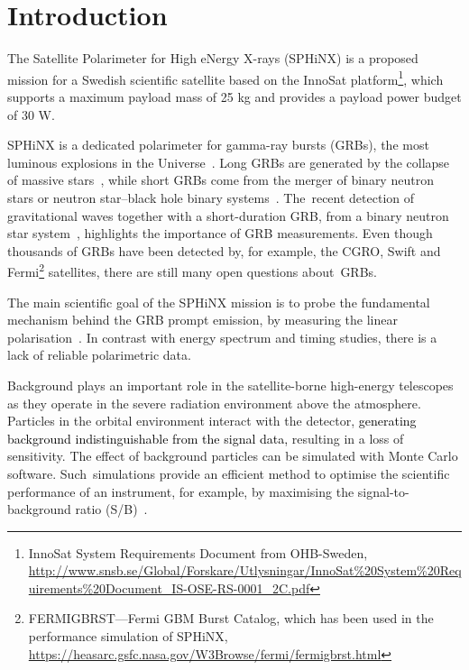 \documentclass[galaxies,article,accept,moreauthors,pdftex,10pt,a4paper]{mdpi}
\begin{document}

\section{Introduction}
\label{sec:intro}
The Satellite Polarimeter for High eNergy X-rays (SPHiNX) is a proposed mission for a Swedish scientific satellite based on the InnoSat platform\footnote{InnoSat System Requirements Document from OHB-Sweden, \url{http://www.snsb.se/Global/Forskare/Utlysningar/InnoSat\%20System\%20Requirements\%20Document_IS-OSE-RS-0001_2C.pdf}}, which supports a maximum payload mass of 25 kg and provides a payload power budget of 30 W.

SPHiNX is a dedicated polarimeter for gamma-ray bursts (GRBs), the most luminous explosions in the Universe~\cite{ref:grb}. Long GRBs are generated by the collapse of massive stars~\cite{ref:collapse}, while short GRBs come from the merger of binary neutron stars or neutron star--black hole binary systems~\cite{ref:merge}. The~recent detection of gravitational waves together with a short-duration GRB, from a binary neutron star system~\cite{ref:gw}, highlights the importance of GRB measurements. Even though thousands of GRBs have been detected by, for example, the CGRO, Swift and Fermi\footnote{FERMIGBRST---Fermi GBM Burst Catalog, which has been used in the performance simulation of SPHiNX, \url{https://heasarc.gsfc.nasa.gov/W3Browse/fermi/fermigbrst.html}} satellites, there are still many open questions about~GRBs.

The main scientific goal of the SPHiNX mission is to probe the fundamental mechanism behind the GRB prompt emission, by measuring the linear polarisation~\cite{ref:grbmodel}. In contrast with energy spectrum and timing studies, there is a lack of reliable polarimetric data.

Background plays an important role in the satellite-borne high-energy telescopes as they operate in the severe radiation environment above the atmosphere. Particles in the orbital environment interact with the detector, \textcolor{black}{generating background indistinguishable from the signal data,} resulting in a loss of sensitivity.
The effect of background particles can be simulated with Monte Carlo software. Such~simulations provide an efficient method to optimise the scientific performance of an instrument, for example, by maximising the signal-to-background ratio (S/B)~\cite{ref:Dean}.
\end{document}
